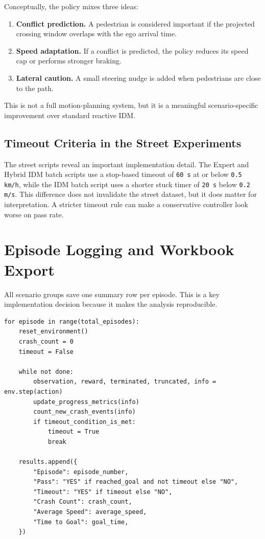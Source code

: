 \documentclass[12pt,a4paper]{report}
\begin{document}
Conceptually, the policy mixes three ideas:

\begin{enumerate}[label=\arabic*.]
    \item \textbf{Conflict prediction.} A pedestrian is considered important if the projected crossing window overlaps with the ego arrival time.
    \item \textbf{Speed adaptation.} If a conflict is predicted, the policy reduces its speed cap or performs stronger braking.
    \item \textbf{Lateral caution.} A small steering nudge is added when pedestrians are close to the path.
\end{enumerate}

This is not a full motion-planning system, but it is a meaningful scenario-specific improvement over standard reactive IDM.

\subsection{Timeout Criteria in the Street Experiments}
The street scripts reveal an important implementation detail. The Expert and Hybrid IDM batch scripts use a stop-based timeout of \texttt{60 s} at or below \texttt{0.5 km/h}, while the IDM batch script uses a shorter stuck timer of \texttt{20 s} below \texttt{0.2 m/s}. This difference does not invalidate the street dataset, but it does matter for interpretation. A stricter timeout rule can make a conservative controller look worse on pass rate.

\section{Episode Logging and Workbook Export}
All scenario groups save one summary row per episode. This is a key implementation decision because it makes the analysis reproducible.

\begin{lstlisting}[caption={Representative episode logging structure used across the batch scripts.},label={lst:logging_logic},float=H]
for episode in range(total_episodes):
    reset_environment()
    crash_count = 0
    timeout = False

    while not done:
        observation, reward, terminated, truncated, info = env.step(action)
        update_progress_metrics(info)
        count_new_crash_events(info)
        if timeout_condition_is_met:
            timeout = True
            break

    results.append({
        "Episode": episode_number,
        "Pass": "YES" if reached_goal and not timeout else "NO",
        "Timeout": "YES" if timeout else "NO",
        "Crash Count": crash_count,
        "Average Speed": average_speed,
        "Time to Goal": goal_time,
    })
\end{lstlisting}
\end{document}
